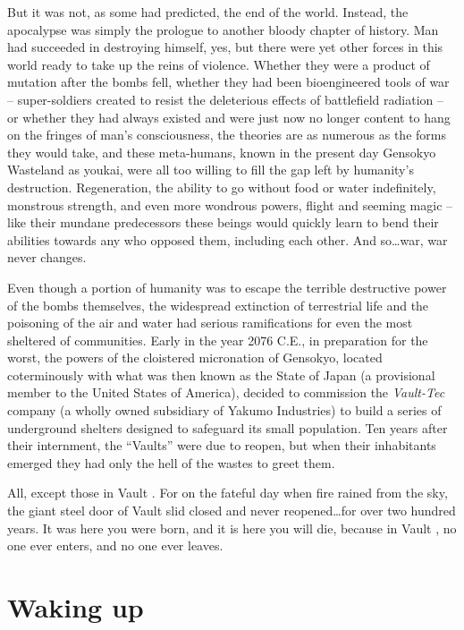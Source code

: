 \documentclass[a4paper,12pt]{book}
\newcommand{\maru}[1]{\raisebox{.5pt}{\textcircled{\raisebox{-.9pt} {#1}}}}
\newcommand{\vaultnine}{Vault \maru{9}}
\begin{document}
But it was not, as some had predicted, the end of the world. Instead, the apocalypse was simply the prologue to another bloody chapter of history. Man had succeeded in destroying himself, yes, but there were yet other forces in this world ready to take up the reins of violence. Whether they were a product of mutation after the bombs fell, whether they had been bioengineered tools of war -- super-soldiers created to resist the deleterious effects of battlefield radiation -- or whether they had always existed and were just now no longer content to hang on the fringes of man's consciousness, the theories are as numerous as the forms they would take, and these meta-humans, known in the present day Gensokyo Wasteland as youkai, were all too willing to fill the gap left by humanity's destruction. Regeneration, the ability to go without food or water indefinitely, monstrous strength, and even more wondrous powers, flight and seeming magic -- like their mundane predecessors these beings would quickly learn to bend their abilities towards any who opposed them, including each other. And so\ldots war, war never changes.

Even though a portion of humanity was to escape the terrible destructive power of the bombs themselves, the widespread extinction of terrestrial life and the poisoning of the air and water had serious ramifications for even the most sheltered of communities. Early in the year 2076 C.E., in preparation for the worst, the powers of the cloistered micronation of Gensokyo, located coterminously with what was then known as the State of Japan (a provisional member to the United States of America), decided to commission the \emph{Vault-Tec} company (a wholly owned subsidiary of Yakumo Industries) to build a series of underground shelters designed to safeguard its small population. Ten years after their internment, the ``Vaults'' were due to reopen, but when their inhabitants emerged they had only the hell of the wastes to greet them.

All, except those in \vaultnine . For on the fateful day when fire rained from the sky, the giant steel door of \vaultnine{} slid closed and never reopened\ldots for over two hundred years. It was here you were born, and it is here you will die, because in \vaultnine, no one ever enters, and no one ever leaves.






\chapter{Waking up}
\end{document}
